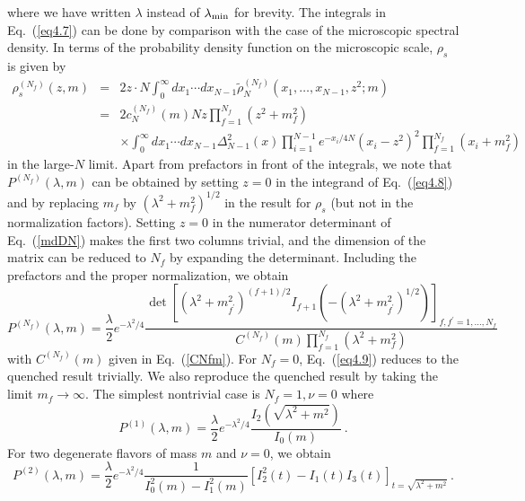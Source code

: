 where we have written $\lambda$ instead of $\lambda_{\rm min}$ for
brevity.  The integrals in Eq.~(\ref{eq4.7}) can be done by comparison
with the case of the microscopic spectral density.  In terms of the
probability density function on the microscopic scale, $\rho_s$ is
given by
\begin{eqnarray}
  \rho_s^{(N_f)}(z,m)&=& 2z\cdot N\int_0^\infty dx_1\cdots dx_{N-1} 
  \widetilde\rho_N^{(N_f)}(x_1,\ldots,x_{N-1},z^2;m)\nonumber\\
  &=&2c_N^{(N_f)}(m)Nz\prod_{f=1}^{N_f}(z^2+m_f^2) \nonumber\\
  &&\times\int_0^\infty dx_1\cdots dx_{N-1}\Delta_{N-1}^2(x)
  \prod_{i=1}^{N-1}
  e^{-x_i/4N} (x_i-z^2)^2 \prod_{f=1}^{N_f}(x_i+m_f^2)
  \label{eq4.8}
\end{eqnarray}
in the large-$N$ limit.  Apart from prefactors in front of the
integrals, we note that $P^{(N_f)}(\lambda,m)$ can be obtained by
setting $z=0$ in the integrand of Eq.~(\ref{eq4.8}) and by replacing
$m_f$ by $(\lambda^2+m_f^2)^{1/2}$ in the result for $\rho_s$ (but not
in the normalization factors).  Setting $z=0$ in the numerator
determinant of Eq.~(\ref{mdDN}) makes the first two columns trivial,
and the dimension of the matrix can be reduced to $N_f$ by expanding
the determinant.  Including the prefactors and the proper
normalization, we obtain
\begin{equation}
  \label{eq4.9}
  P^{(N_f)}(\lambda,m)=\frac{\lambda}{2}e^{-\lambda^2/4}
  \frac{\det\left[\left(\lambda^2+m_{f^\prime}^2\right)^{(f+1)/2}
        I_{f+1}\left(-(\lambda^2+m_{f^\prime}^2)^{1/2}\right)
        \right]_{f,f^\prime=1,\ldots,N_f}}
  {C^{(N_f)}(m)\prod_{f=1}^{N_f}(\lambda^2+m_f^2)}
\end{equation}
with $C^{(N_f)}(m)$ given in Eq.~(\ref{CNfm}).  For $N_f=0$,
Eq.~(\ref{eq4.9}) reduces to the quenched result trivially.  We also
reproduce the quenched result by taking the limit $m_f\to\infty$.  The
simplest nontrivial case is $N_f=1, \nu=0$ where
\begin{equation}
  \label{eq4.10}
  P^{(1)}(\lambda,m)=\frac{\lambda}{2}e^{-\lambda^2/4}
  \frac{I_2\left(\sqrt{\lambda^2+m^2}\right)}{I_0(m)}\:.
\end{equation}
For two degenerate flavors of mass $m$ and $\nu=0$, we obtain
\begin{equation}
  \label{eq4.11}
  P^{(2)}(\lambda,m)=
  \frac{\lambda}{2}e^{-\lambda^2/4}
  \frac{1}{I_0^2(m)-I_1^2(m)}
  \left[I_2^2(t)-I_1(t)I_3(t)\right]_{t=\sqrt{\lambda^2+m^2}}\:.
\end{equation}
